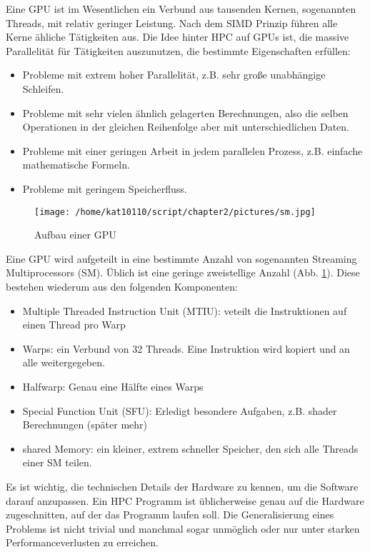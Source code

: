 		Eine GPU ist im Wesentlichen ein Verbund aus tausenden Kernen, sogenannten \Glspl{Thread}, mit relativ geringer Leistung. Nach dem SIMD Prinzip führen alle Kerne ähliche Tätigkeiten aus. Die Idee hinter HPC auf GPUs ist, die massive Parallelität für Tätigkeiten auszunutzen, die bestimmte Eigenschaften erfüllen:
		\begin{itemize}
			\item Probleme mit extrem hoher Parallelität, z.B. sehr große unabhängige Schleifen.
			\item Probleme mit sehr vielen ähnlich gelagerten Berechnungen, also die selben Operationen in der gleichen Reihenfolge aber mit unterschiedlichen Daten.
			\item Probleme mit einer geringen \Gls{Arbeit} in jedem parallelen Prozess, z.B. einfache mathematische Formeln.
			\item Probleme mit geringem Speicherfluss.			
		\end{itemize}
			
		\begin{figure}[h]
			\centering
    		\texttt{[image: /home/kat10110/script/chapter2/pictures/sm.jpg]}
    		\caption[GPU]{Aufbau einer GPU}
    		\label{2:gpu}
		\end{figure}
		
		Eine GPU wird aufgeteilt in eine bestimmte Anzahl von sogenannten Streaming Multiprocessors (\Gls{SM}). Üblich ist eine geringe zweistellige Anzahl (Abb. \ref{2:gpu}). Diese bestehen wiederum aus den folgenden Komponenten:
		\begin{itemize}
		\item Multiple Threaded Instruction Unit (\Gls{MTIU}): veteilt die Instruktionen auf einen \Gls{Thread} pro \Gls{Warp}
		\item \Glspl{Warp}: ein Verbund von 32 \Glspl{Thread}. Eine Instruktion wird kopiert und an alle weitergegeben.
		\item \Gls{Halfwarp}: Genau eine Hälfte eines \glspl{Warp}
		\item Special Function Unit (SFU): Erledigt besondere Aufgaben, z.B. shader Berechnungen (später mehr) 
		\item \Gls{shared Memory}: ein kleiner, extrem schneller Speicher, den sich alle \Glspl{Thread} einer \Gls{SM} teilen.
		\end{itemize}

		Es ist wichtig, die technischen Details der Hardware zu kennen, um die Software darauf anzupassen. Ein HPC Programm ist üblicherweise genau auf die Hardware zugeschnitten, auf der das Programm laufen soll. Die Generalisierung eines Problems ist nicht trivial und manchmal sogar unmöglich oder nur unter starken \Gls{Performance}verlusten zu erreichen.	